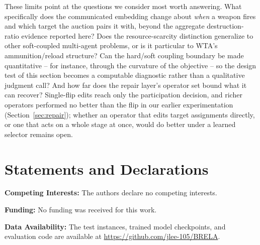 These limits point at the questions we consider most worth answering. What specifically does the communicated embedding change about \emph{when} a weapon fires and which target the auction pairs it with, beyond the aggregate destruction-ratio evidence reported here? Does the resource-scarcity distinction generalize to other soft-coupled multi-agent problems, or is it particular to WTA's ammunition/reload structure? Can the hard/soft coupling boundary be made quantitative -- for instance, through the curvature of the objective -- so the design test of this section becomes a computable diagnostic rather than a qualitative judgment call? And how far does the repair layer's operator set bound what it can recover? Single-flip edits reach only the participation decision, and richer operators performed no better than the flip in our earlier experimentation (Section~\ref{sec:repair}); whether an operator that edits target assignments directly, or one that acts on a whole stage at once, would do better under a learned selector remains open.

\section*{Statements and Declarations}

\textbf{Competing Interests:} The authors declare no competing interests.

\textbf{Funding:} No funding was received for this work.

\textbf{Data Availability:} The test instances, trained model checkpoints, and evaluation code are available at \url{https://github.com/jlee-105/BRELA}.




